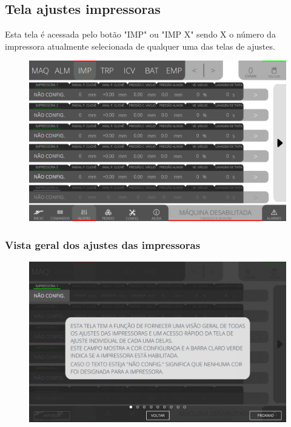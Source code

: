 \thispagestyle{fancy}
\vspace*{40 pt}
\subsection{Tela ajustes impressoras} \label{sec:telaAjustesImpressoras}
Esta tela é acessada pelo botão "IMP" ou "IMP X" sendo X o número da impressora atualmente selecionada de qualquer uma das telas de ajustes.
\vspace*{\fill}
\begin{figure}[h]
    \centering
    \includegraphics[width=480 px,height=300 px]{src/imagesICV/04-printters/01-printters/settings/e-Tela-Principal.png}
\end{figure}
\vspace*{\fill}

\newpage
\thispagestyle{fancy}
\vspace*{40 pt}
\subsubsection{\small{Vista geral dos ajustes das impressoras}} \label{sec:telaAjustesImpressorasVistaGeralAjustesImpressoras}
\vspace*{\fill}
\begin{figure}[h]
    \centering
    \includegraphics[width=576 px,height=360 px]{src/imagesICV/04-printters/01-printters/settings/1.png}
\end{figure}
\vspace*{\fill}

